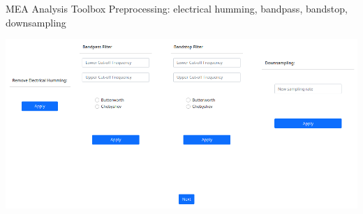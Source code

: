 \documentclass[10pt]{beamer}
\begin{document}
\begin{frame}[allowframebreaks]{MEA Analysis Toolbox}
     Preprocessing: electrical humming, bandpass, bandstop, downsampling \\
      \begin{center}
        \includegraphics[keepaspectratio,width=0.8\framewidth]{img/4_preproc.png}
      \end{center} 
      \framebreak
      

\end{frame}
\end{document}
